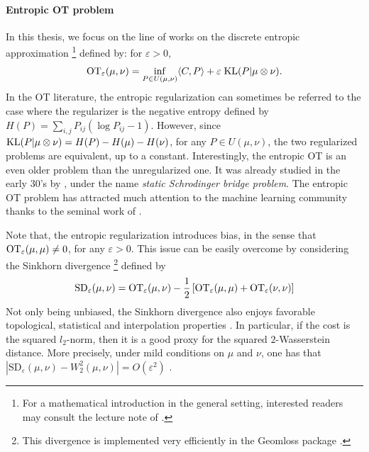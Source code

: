 \paragraph{Entropic OT problem}
In this thesis, we focus on the line of works on the discrete entropic approximation
\footnote{For a mathematical introduction in the general setting,
interested readers may consult the lecture note of \citep{Nutz22}.} defined by:
for $\varepsilon > 0$,
\begin{align}
  \label{eq:primal_ot}
  \text{OT}_{\varepsilon}(\mu, \nu) = \inf_{P \in U(\mu, \nu)} \langle C, P \rangle +
  \varepsilon \; \text{KL}(P | \mu \otimes \nu).
\end{align}
In the OT literature, the entropic regularization can sometimes be referred to the case where
the regularizer is the negative entropy defined by $H(P) = \sum_{i,j} P_{ij} (\log P_{ij} - 1)$.
However, since $\text{KL}(P | \mu \otimes \nu) = H(P) - H(\mu) - H(\nu)$, for any $P \in U(\mu, \nu)$,
the two regularized problems are equivalent, up to a constant.
Interestingly, the entropic OT is an even older problem than the unregularized one.
It was already studied in the early 30's by \citep{Schrodinger32},
under the name \textit{static Schrodinger bridge problem}.
The entropic OT problem has attracted much attention to the
machine learning community thanks to the seminal work of \citep{Cuturi13}.

Note that, the entropic regularization introduces bias,
in the sense that $\text{OT}_{\varepsilon}(\mu, \mu) \neq 0$, for any $\varepsilon > 0$.
This issue can be easily overcome by considering the Sinkhorn divergence
\footnote{This divergence is implemented very efficiently in the Geomloss package \citep{Feydy19}.}
\citep{Ramdas17,Feydy19} defined by
\begin{align*}
  \text{SD}_{\varepsilon}(\mu, \nu) = \text{OT}_{\varepsilon}(\mu, \nu)
  - \frac{1}{2} \left[ \text{OT}_{\varepsilon}(\mu, \mu) + \text{OT}_{\varepsilon}(\nu, \nu) \right]
\end{align*}
Not only being unbiased, the Sinkhorn divergence also enjoys favorable topological, statistical
and interpolation properties \citep{Feydy19,Genevay19}. In particular,
if the cost is the squared $l_2$-norm, then it is a good proxy
for the squared $2$-Wasserstein distance. More precisely, under mild conditions on $\mu$ and $\nu$,
one has that $| \text{SD}_{\varepsilon}(\mu, \nu) - W_2^2(\mu, \nu) | = O(\varepsilon^2)$
\citep{Chizat20}.

